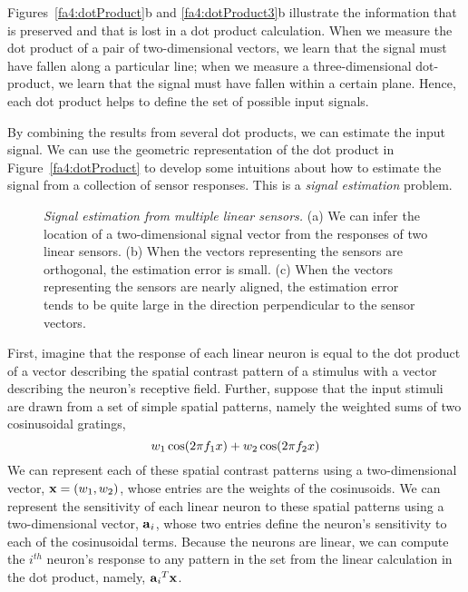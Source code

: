 Figures~\ref{fa4:dotProduct}b and \ref{fa4:dotProduct3}b illustrate
the information that is preserved and that is lost in a dot product
calculation.  When we measure the dot product of a pair of
two-dimensional vectors, we learn that the signal must have fallen
along a particular line; when we measure a three-dimensional
dot-product, we learn that the signal must have fallen within a
certain plane.  Hence, each dot product helps to define the set of
possible input signals.

By combining the results from several dot products, we can
estimate the input signal.  We can use the geometric representation of
the dot product in Figure~\ref{fa4:dotProduct} to develop some
intuitions about how to estimate the signal from a collection of
sensor responses.  This is a {\em signal estimation} problem.

\begin{figure}
\centerline{
}
\caption[Estimation of the Signal from the Responses]{
{\em Signal estimation from multiple linear sensors.}  (a) We can
infer the location of a two-dimensional signal vector from the
responses of two linear sensors. (b) When the vectors representing the
sensors are orthogonal, the estimation error is small.  (c) When the
vectors representing the sensors are nearly aligned, the estimation
error tends to be quite large in the direction perpendicular to the
sensor vectors.  }
\label{fa4:estimation}
\end{figure}
First, imagine that the response of each linear neuron is equal to the
dot product of a vector describing the spatial contrast pattern of a
stimulus with a vector describing the neuron's receptive field.
Further, suppose that the input stimuli are drawn from a set of simple
spatial patterns, namely the weighted sums of two cosinusoidal
gratings,
\[
\mbox{${w}_{1}$} \cos(2 \pi f_1 x) + \mbox{${w}_{2}$} \cos(2 \pi f_2 x)
\]
We can represent each of these spatial contrast patterns using a
two-dimensional vector, $\mbox{${\bf x}$} = (w_1, w_2)$, whose entries are the
weights of the cosinusoids.  We can represent the sensitivity of each
linear neuron to these spatial patterns using a two-dimensional
vector, $\mbox{${\bf a}$}_i$, whose two entries define the neuron's
sensitivity to each of the cosinusoidal terms.  Because the neurons
are linear, we can compute the $i^{th}$ neuron's response to any
pattern in the set from the linear calculation in the dot product,
namely, ${\mbox{${\bf a}$}_i}^T \mbox{${\bf x}$}$.

